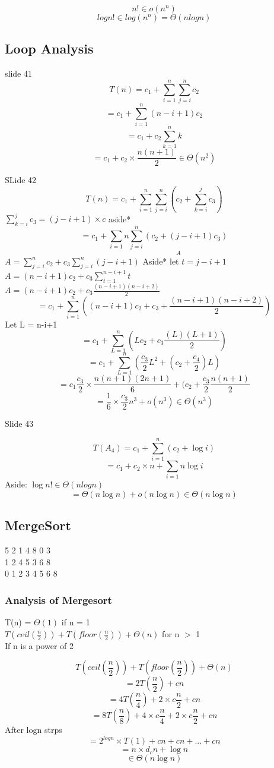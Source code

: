 \documentclass[12pt]{article}
\begin{document}
		$$n! \in o(n^n)$$
		$$logn! \in log(n^n) = \Theta(nlogn)$$
		
		\subsection*{Loop Analysis}
		slide 41\\
		
		$$T(n) = c_1 + \sum_{i=1}^{n}\sum_{j=i}^{n}c_2$$
		$$=c_1 + \sum_{i=1}^{n}(n-i+1)c_2$$
		$$=c_1 + c_2 \sum_{k=1}^{n}k$$
		$$=c_1 + c_2 \times \frac{n(n+1)}{2} \in \Theta(n^2)$$
		
		SLide 42\\
		
		$$T(n) = c_1 + \sum_{i=1}^{n} \sum_{j=i}^{n}(c_2 + \sum_{k=i}^{j}c_3)$$
		$\sum_{k=i}^{j}c_3 = (j-i+1) \times c$ aside*
		$$ = c_1 + \sum_{i=1}{n}\underset{A}{\sum_{j=i}^{n}(c_2 + (j-i+1)c_3)}$$
		$A = \sum_{j=i}^{n}c_2 + c_3 \sum_{j=i}^{n}(j-i + 1)$ Aside* let $t=j-i+1$\\
		$A = (n-i+1)c_2 + c_3 \sum_{t=1}^{n-i+1}t$\\
		$A=(n-i+1)c_2 + c_3 \frac{(n-i+1)(n-i+2)}{2}$
		$$ = c_1 + \sum_{i=1}^{n}((n-i+1)c_2 + c_3 + \frac{(n-i+1)(n-i+2)}{2})$$
		Let L = n-i+1
		$$= c_1 + \sum_{L=1}^{n}(Lc_2 + c_3\frac{(L)(L+1)}{2})$$
		$$= c_1 + \sum_{L=1}^{n}(\frac{c_3}{2}L^2 + (c_2 + \frac{c_4}{2})L)$$
		$$= c_1 \frac{c_3}{2} \times \frac{n(n+1)(2n+1)}{6} + (c_2 + \frac{c_3}{2}\frac{n(n+1)}{2}$$
		$$= \frac{1}{6} \times \frac{c_3}{2}n^3 + o(n^3) \in \Theta(n^3)$$
		
		Slide 43
		
		$$T(A_4) = c_1 + \sum_{i=1}^{n}(c_2 + \log{i})$$
		$$ = c_1 + c_2 \times n + \sum_{i=1}{n}\log{i}$$
		Aside: $\log{n!} \in \Theta(nlogn)$
		$$= \Theta(n\log{n}) + o(n\log{n}) \in \Theta(n\log{n})$$
		
		\subsection*{MergeSort}
		
		5 2 1 4  8 0 3\\
		1 2 4 5  3 6 8\\
		0 1 2 3 4 5 6 8\\
		
		\subsubsection*{Analysis of Mergesort}
		T(n) = 
		$\Theta(1)$ if n = 1\\
		$T(ceil(\frac{n}{2})) + T(floor(\frac{n}{2})) + \Theta(n)$ for n $>$ 1\\
		
		If n is a power of 2
		
		$$T(ceil(\frac{n}{2})) + T(floor(\frac{n}{2})) + \Theta(n)$$
		$$= 2T(\frac{n}{2}) + cn$$
		$$= 4T(\frac{n}{4}) + 2 \times c\frac{n}{2} + cn$$
		$$= 8T(\frac{n}{8}) + 4 \times c\frac{n}{4} + 2\times c\frac{n}{2} + cn$$
		After logn strps
		$$= 2^{logn} \times T(1) + cn + cn +... + cn$$
		$$ = n\times d _ cn + \log{n}$$
		$$ \in \Theta(n\log{n})$$
	
	
\end{document}
